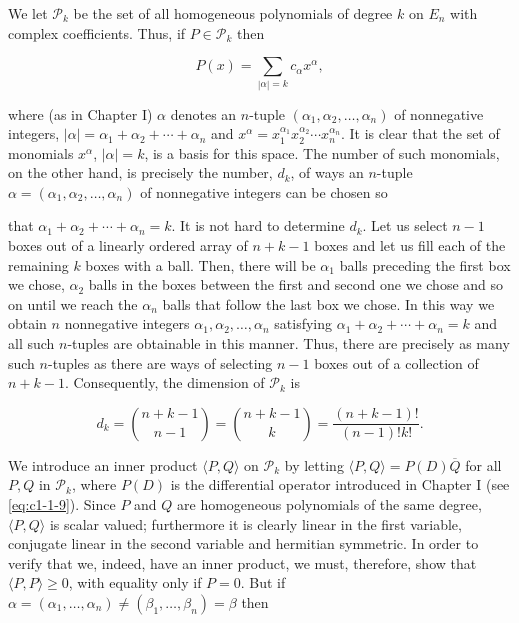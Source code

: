 We let $\mathcal{P}_k$ be the set of all homogeneous polynomials of degree $k$ on $E_n$ with complex coefficients. Thus, if $P \in \mathcal{P}_k$ then

\[
P(x)=\sum_{|\alpha|=k}c_\alpha x^\alpha,
\]

where (as in Chapter I) $\alpha$ denotes an $n$-tuple $(\alpha_1, \alpha_2, \ldots, \alpha_n)$ of nonnegative integers, $|\alpha| = \alpha_1 + \alpha_2 + \cdots + \alpha_n$ and $x^\alpha = x_{1}^{\alpha_1} x_{2}^{\alpha_2} \cdots x_{n}^{\alpha_n}$. It is clear that the set of monomials $x^\alpha$, $|\alpha| = k$, is a basis for this space. The number of such monomials, on the other hand, is precisely the number, $d_k$, of ways an $n$-tuple $\alpha = (\alpha_1, \alpha_2, \ldots, \alpha_n)$ of nonnegative integers can be chosen so

that $\alpha_1 + \alpha_2 + \cdots + \alpha_n = k$. It is not hard to determine $d_k$. Let us select $n - 1$ boxes out of a linearly ordered array of $n + k - 1$ boxes and let us fill each of the remaining $k$ boxes with a ball. Then, there will be $\alpha_1$ balls preceding the first box we chose, $\alpha_2$ balls in the boxes between the first and second one we chose and so on until we reach the $\alpha_n$ balls that follow the last box we chose. In this way we obtain $n$ nonnegative integers $\alpha_1, \alpha_2, \ldots, \alpha_n$ satisfying $\alpha_1 + \alpha_2 + \cdots + \alpha_n = k$ and all such $n$-tuples are obtainable in this manner. Thus, there are precisely as many such $n$-tuples as there are ways of selecting $n - 1$ boxes out of a collection of $n + k - 1$. Consequently, the dimension of $\mathcal{P}_k$ is

\[
d_{k}=\binom{n+k-1}{n-1}=\binom{n+k-1}{k}=\frac{(n+k-1)!}{(n-1)!k!}.
\]

We introduce an inner product $\langle P, Q \rangle$ on $\mathcal{P}_k$ by letting $\langle P, Q \rangle = P(D) \overline{Q}$ for all $P, Q$ in $\mathcal{P}_k$, where $P(D)$ is the differential operator introduced in Chapter I (see \eqref{eq:c1-1-9}). Since $P$ and $Q$ are homogeneous polynomials of the same degree, $\langle P, Q \rangle$ is scalar valued; furthermore it is clearly linear in the first variable, conjugate linear in the second variable and hermitian symmetric. In order to verify that we, indeed, have an inner product, we must, therefore, show that $\langle P, P \rangle \geq 0$, with equality only if $P = 0$. But if $\alpha = (\alpha_1, \ldots, \alpha_n) \neq (\beta_1, \ldots, \beta_n) = \beta$ then


